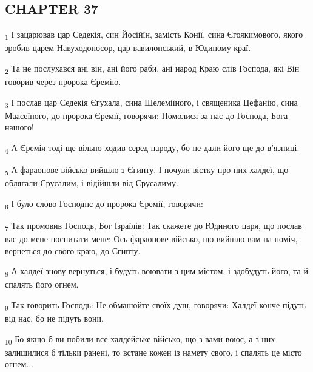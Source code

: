 \subsection{CHAPTER 37}
\begin{tcolorbox}
\textsubscript{1} І зацарював цар Седекія, син Йосійїн, замість Конії, сина Єгоякимового, якого зробив царем Навуходоносор, цар вавилонський, в Юдиному краї.
\end{tcolorbox}
\begin{tcolorbox}
\textsubscript{2} Та не послухався ані він, ані його раби, ані народ Краю слів Господа, які Він говорив через пророка Єремію.
\end{tcolorbox}
\begin{tcolorbox}
\textsubscript{3} І послав цар Седекія Єгухала, сина Шелеміїного, і священика Цефанію, сина Маасеїного, до пророка Єремії, говорячи: Помолися за нас до Господа, Бога нашого!
\end{tcolorbox}
\begin{tcolorbox}
\textsubscript{4} А Єремія тоді ще вільно ходив серед народу, бо не дали його ще до в'язниці.
\end{tcolorbox}
\begin{tcolorbox}
\textsubscript{5} А фараонове військо вийшло з Єгипту. І почули вістку про них халдеї, що облягали Єрусалим, і відійшли від Єрусалиму.
\end{tcolorbox}
\begin{tcolorbox}
\textsubscript{6} І було слово Господнє до пророка Єремії, говорячи:
\end{tcolorbox}
\begin{tcolorbox}
\textsubscript{7} Так промовив Господь, Бог Ізраїлів: Так скажете до Юдиного царя, що послав вас до мене поспитати мене: Ось фараонове військо, що вийшло вам на поміч, вернеться до свого краю, до Єгипту.
\end{tcolorbox}
\begin{tcolorbox}
\textsubscript{8} А халдеї знову вернуться, і будуть воювати з цим містом, і здобудуть його, та й спалять його огнем.
\end{tcolorbox}
\begin{tcolorbox}
\textsubscript{9} Так говорить Господь: Не обманюйте своїх душ, говорячи: Халдеї конче підуть від нас, бо не підуть вони.
\end{tcolorbox}
\begin{tcolorbox}
\textsubscript{10} Бо якщо б ви побили все халдейське військо, що з вами воює, а з них залишилися б тільки ранені, то встане кожен із намету свого, і спалять це місто огнем...
\end{tcolorbox}
